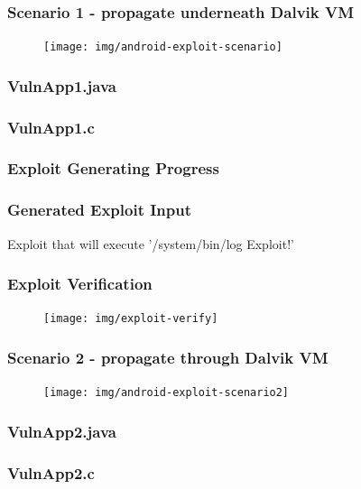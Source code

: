 \documentclass[t,xcolor=table,usenames,dvipsnames]{beamer}
\begin{document}
\begin{frame}
    \frametitle{Scenario 1 - propagate underneath Dalvik VM}
    \begin{figure}
    \texttt{[image: img/android-exploit-scenario]}
    \end{figure}
\end{frame}

\begin{frame}
    \frametitle{VulnApp1.java}
    
\end{frame}

\begin{frame}
    \frametitle{VulnApp1.c}
    
\end{frame}

\begin{frame}
    \frametitle{Exploit Generating Progress}
    
\end{frame}

\begin{frame}
    \frametitle{Generated Exploit Input}
    Exploit that will execute '/system/bin/log Exploit!'
    
\end{frame}

\begin{frame}
    \frametitle{Exploit Verification}
    \begin{figure}
    \texttt{[image: img/exploit-verify]}
    \end{figure}
\end{frame}

\begin{frame}
    \frametitle{Scenario 2 - propagate through Dalvik VM}
    \begin{figure}
    \texttt{[image: img/android-exploit-scenario2]}
    \end{figure}
\end{frame}

\begin{frame}
    \frametitle{VulnApp2.java}
    
\end{frame}

\begin{frame}
    \frametitle{VulnApp2.c}
    
\end{frame}
\end{document}
